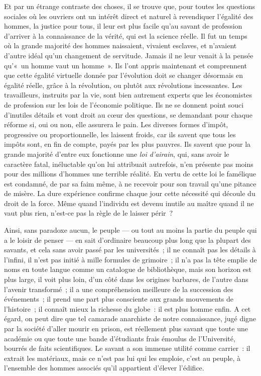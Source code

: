 \documentclass[french,twoside]{book} %
\begin{document}
Et par un étrange contraste des choses, il se trouve que, pour toutes les questions sociales où les ouvriers ont un intérêt direct et naturel à revendiquer  l’égalité des hommes, la justice pour tous, il leur est plus facile qu’au savant de profession d’arriver à la connaissance de la vérité, qui est la science réelle. Il fut un temps où la grande majorité des hommes naissaient, vivaient esclaves, et n’avaient d’autre idéal qu’un changement de servitude. Jamais il ne leur venait à la pensée qu’« un homme vaut un homme ». Ils l’ont appris maintenant et comprennent que cette égalité virtuelle donnée par l’évolution doit se changer désormais en égalité réelle, grâce à la révolution, ou plutôt aux révolutions incessantes. Les travailleurs, instruits par la vie, sont bien autrement experts que les économistes de profession sur les lois de l’économie politique. Ils ne se donnent point souci d’inutiles détails et vont droit au cœur des questions,  se demandant pour chaque réforme si, oui ou non, elle assurera le pain. Les diverses formes d’impôt, progressive ou proportionnelle, les laissent froids, car ils savent que tous les impôts sont, en fin de compte, payés par les plus pauvres. Ils savent que pour la grande majorité d’entre eux fonctionne une \emph{loi d’airain}, qui, sans avoir le caractère fatal, inéluctable qu’on lui attribuait autrefois, n’en présente pas moins pour des millions d’hommes une terrible réalité. En vertu de cette loi le famélique est condamné, de par sa faim même, à ne recevoir pour son travail qu’une pitance de misère. La dure expérience confirme chaque jour cette nécessité qui découle du droit de la force. Même quand l’individu est devenu inutile au maître quand il ne vaut plus rien,  n’est-ce pas la règle de le laisser périr ?\par
Ainsi, sans paradoxe aucun, le peuple — ou tout au moins la partie du peuple qui a le loisir de penser — en sait d’ordinaire beaucoup plus long que la plupart des savants, et cela sans avoir passé par les universités ; il ne connaît pas les détails à l’infini, il n’est pas initié à mille formules de grimoire ; il n’a pas la tête emplie de noms en toute langue comme un catalogue de bibliothèque, mais son horizon est plus large, il voit plus loin, d’un côté dans les origines barbares, de l’autre dans l’avenir transformé ; il a une compréhension meilleure de la succession des événements ; il prend une part plus consciente aux grands mouvements de l’histoire ; il connaît mieux la richesse du globe : il est plus homme enfin. A cet égard,  on peut dire que tel camarade anarchiste de notre connaissance, jugé digne par la société d’aller mourir en prison, est réellement plus savant que toute une académie ou que toute une bande d’étudiants frais émoulus de l’Université, bourrés de faits scientifiques. Le savant a son immense utilité comme carrier : il extrait les matériaux, mais ce n’est pas lui qui les emploie, c’est au peuple, à l’ensemble des hommes associés qu’il appartient d’élever l’édifice.\par
\end{document}
